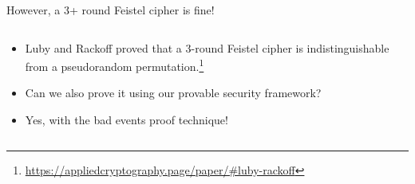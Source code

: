 \documentclass[aspectratio=169, lualatex, handout]{beamer}
\begin{document}
	\begin{frame}{However, a 3+ round Feistel cipher is fine!}
		\begin{columns}[c]
			\begin{column}{0.4\textwidth}
				\begin{itemize}
					\item Luby and Rackoff proved that a 3-round Feistel cipher is indistinguishable from a pseudorandom permutation.\footnote{\url{https://appliedcryptography.page/paper/\#luby-rackoff}}
					\item Can we also prove it using our provable security framework?
					\item Yes, with the bad events proof technique!
				\end{itemize}
			\end{column}
			\begin{column}{0.6\textwidth}
				\begin{center}
				\end{center}
			\end{column}
		\end{columns}
	\end{frame}
\end{document}
